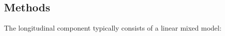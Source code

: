 \documentclass[a0,portrait]{a0poster}
\begin{document}
\color{DarkSlateGray}
\begin{multicols}{2}
\section*{Methods}
\begin{center}
    \label{Fig1}
\end{center}
\vspace{1cm}
\par{The longitudinal component typically consists of a linear mixed model:}


\end{multicols}
\end{document}
